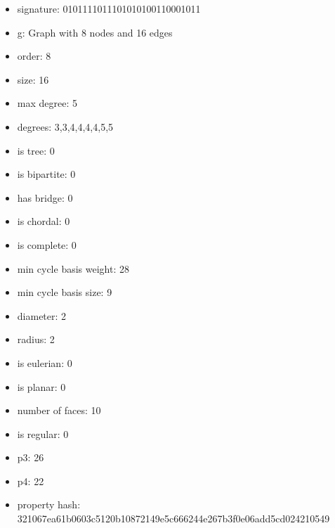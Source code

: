 \begin{itemize}
\item signature: 0101111011101010100110001011
\item g: Graph with 8 nodes and 16 edges
\item order: 8
\item size: 16
\item max degree: 5
\item degrees: 3,3,4,4,4,4,5,5
\item is tree: 0
\item is bipartite: 0
\item has bridge: 0
\item is chordal: 0
\item is complete: 0
\item min cycle basis weight: 28
\item min cycle basis size: 9
\item diameter: 2
\item radius: 2
\item is eulerian: 0
\item is planar: 0
\item number of faces: 10
\item is regular: 0
\item p3: 26
\item p4: 22
\item property hash: 321067ea61b0603c5120b10872149e5c666244e267b3f0e06add5cd024210549
\end{itemize}
\newpage
\begin{figure}
\end{figure}
